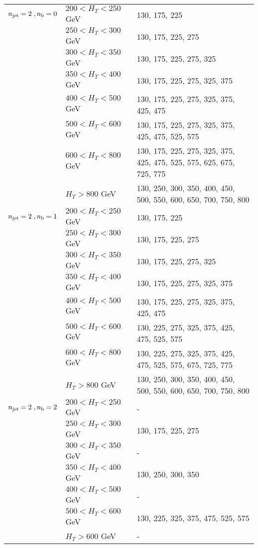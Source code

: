 \begin{table}[h!]
\begin{tabular}{ lll }
    \hline
    $n_{\text{jet}} = 2 \;, n_{\text{b}} = 0 $ & $200 < H_{T} < 250$ GeV & 130, 175, 225 \\ 
     & $250 < H_{T} < 300$ GeV & 130, 175, 225, 275 \\ 
     & $300 < H_{T} < 350$ GeV & 130, 175, 225, 275, 325 \\ 
     & $350 < H_{T} < 400$ GeV & 130, 175, 225, 275, 325, 375 \\ 
     & $400 < H_{T} < 500$ GeV & 130, 175, 225, 275, 325, 375, 425, 475 \\ 
     & $500 < H_{T} < 600$ GeV & 130, 175, 225, 275, 325, 375, 425, 475, 525, 575 \\ 
     & $600 < H_{T} < 800$ GeV & 130, 175, 225, 275, 325, 375, 425, 475, 525, 575, 625, 675, 725, 775 \\ 
     & $H_{T} > 800$ GeV & 130, 250, 300, 350, 400, 450, 500, 550, 600, 650, 700, 750, 800 \\ 
    \hline
    $n_{\text{jet}} = 2 \;, n_{\text{b}} = 1$ & $200 < H_{T} < 250$ GeV & 130, 175, 225 \\ 
     & $250 < H_{T} < 300$ GeV & 130, 175, 225, 275 \\ 
     & $300 < H_{T} < 350$ GeV & 130, 175, 225, 275, 325 \\ 
     & $350 < H_{T} < 400$ GeV & 130, 175, 225, 275, 325, 375 \\ 
     & $400 < H_{T} < 500$ GeV & 130, 175, 225, 275, 325, 375, 425, 475 \\ 
     & $500 < H_{T} < 600$ GeV & 130, 225, 275, 325, 375, 425, 475, 525, 575 \\ 
     & $600 < H_{T} < 800$ GeV & 130, 225, 275, 325, 375, 425, 475, 525, 575, 675, 725, 775 \\ 
     & $H_{T} > 800$ GeV & 130, 250, 300, 350, 400, 450, 500, 550, 600, 650, 700, 750, 800 \\ 
    \hline
    $n_{\text{jet}} = 2 \;, n_{\text{b}} = 2 $ & $200 < H_{T} < 250$ GeV & - \\ 
     & $250 < H_{T} < 300$ GeV & 130, 175, 225, 275 \\ 
     & $300 < H_{T} < 350$ GeV & - \\ 
     & $350 < H_{T} < 400$ GeV & 130, 250, 300, 350 \\ 
     & $400 < H_{T} < 500$ GeV & - \\ 
     & $500 < H_{T} < 600$ GeV & 130, 225, 325, 375, 475, 525, 575 \\ 
     & $H_{T} > 600$ GeV & - \\ 

  \end{tabular}
\end{table}



